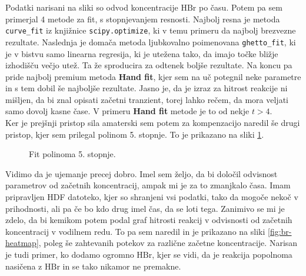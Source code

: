 \documentclass[a4paper]{article}
\begin{document}
Podatki narisani na sliki so odvod koncentracije $\mathrm{HBr}$ po času. Potem pa sem primerjal 4 metode 
za fit, s stopnjevanjem resnosti. Najbolj resna je metoda \texttt{curve\_fit} iz knjižnice \texttt{scipy.optimize}, ki 
v temu primeru da najbolj brezvezne rezultate. Naslednja je domača metoda ljubkovalno poimenovana \texttt{ghetto\_fit},
ki je v bistvu samo linearna regresija, ki je utežena tako, da imajo točke bližje izhodišču večjo utež. Ta že
sproducira za odtenek boljše rezultate. Na koncu pa pride najbolj premium metoda \textbf{Hand fit}, kjer sem 
na uč potegnil neke parametre in s tem dobil še najboljše rezultate. Jasno je, da je izraz za hitrost reakcije 
ni mišljen, da bi znal opisati začetni tranzient, torej lahko rečem, da mora veljati samo dovolj kasne čase. V primeru
\textbf{Hand fit} metode je to od nekje $t > 4$.\\

Ker je prejšnji pristop sila amaterski sem potem za kompenzacijo naredil še drugi pristop, kjer sem prilegal
polinom 5. stopnje. To je prikazano na sliki \ref{fig:br-poly}. 

\begin{figure}[H]
    \centering
    \caption{Fit polinoma 5. stopnje.}
    \label{fig:br-poly}
\end{figure}

Vidimo da je ujemanje precej dobro. Imel sem željo, da bi določil odvisnost parametrov od začetnih koncentracij,
ampak mi je za to zmanjkalo časa. Imam pripravljen HDF datoteko, kjer so shranjeni vsi podatki, tako da mogoče
nekoč v prihodnosti, ali pa če bo kdo drug imel čas, da se loti tega. Zanimivo se mi je zdelo, da bi kemikom potem 
podal graf hitrosti reakcij v odvisnosti od začetnih koncentracij v vodilnem redu. To pa sem naredil in je 
prikazano na sliki \ref{fig:br-heatmap}, poleg še zahtevanih potekov za različne začetne koncentracije. Narisan je 
tudi primer, ko dodamo ogromno $\mathrm{HBr}$, kjer se vidi, da je reakcija popolnoma nasičena z $\mathrm{HBr}$ in 
se tako nikamor ne premakne. 
\end{document}
